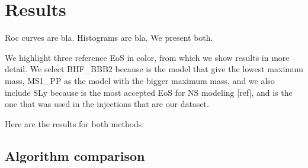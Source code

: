 \documentclass[aps,prd,twocolumn,superscriptaddress,preprintnumbers,floatfix,nofootinbib]{revtex4-2}
\begin{document}
\section{Results}
Roc curves are bla. Histograms are bla. We present both.

We highlight three reference EoS in color, from which we show results in more detail. We select BHF\_BBB2 because is the model that give the lowest maximum mass, MS1\_PP as the model with the bigger maximum mass, and we also include SLy because is the most accepted EoS for NS modeling [ref], and is the one that was used in the injections that are our dataset.

Here are the results for both methods:
\subsection{Algorithm comparison}







\def\bibsection{\section*{References}}


\end{document}
